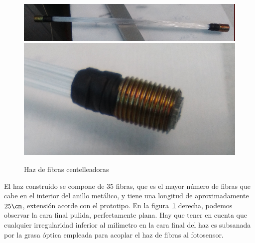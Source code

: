 \begin{figure}[htb]
\centering
{
\includegraphics[scale=0.33]{bunchfibras.png} 
}
{
\includegraphics[scale=0.33]{bunchfibras1.png} 
}
\caption{Haz de fibras centelleadoras\label{Bunch}}
\end{figure} 

El haz  construido se compone de $35$ fibras, que es el mayor número de fibras que cabe en el interior del anillo metálico, y tiene una longitud de aproximadamente $25\cm$, extensión acorde con el prototipo. En la figura~\ref{Bunch} derecha, podemos observar la cara final pulida, perfectamente plana. Hay que tener en cuenta que cualquier irregularidad inferior al milímetro en la cara final del haz es subsanada por la grasa óptica empleada para acoplar el haz de fibras al fotosensor.
